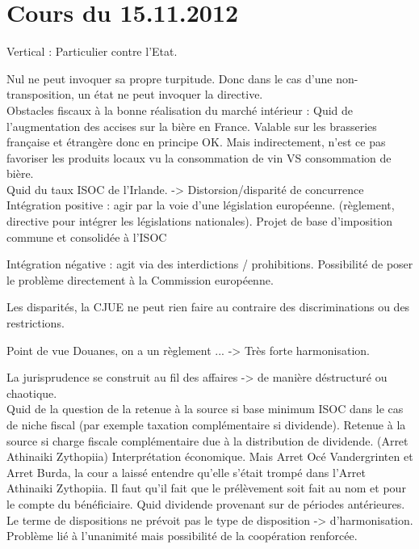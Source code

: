 \documentclass{book}
\begin{document}
  
\chapter{Cours du 15.11.2012}

Vertical : Particulier contre l'Etat.

Nul ne peut invoquer sa propre turpitude. Donc dans le cas d'une non-transposition, un état ne peut invoquer la directive.\\

Obstacles fiscaux à la bonne réalisation du marché intérieur : Quid de l'augmentation des accises sur la bière en France. Valable sur les brasseries française et étrangère donc en principe OK. Mais indirectement, n'est ce pas favoriser les produits locaux vu la consommation de vin VS consommation de bière.\\

Quid du taux ISOC de l'Irlande. -> Distorsion/disparité de concurrence\\

Intégration positive : agir par la voie d'une législation européenne. (règlement, directive pour intégrer les législations nationales). Projet de base d'imposition commune et consolidée à l'ISOC

Intégration négative : agit via des interdictions / prohibitions. Possibilité de poser le problème directement à la Commission européenne.

Les disparités, la CJUE ne peut rien faire au contraire des discriminations ou des restrictions.

Point de vue Douanes, on a un règlement ... -> Très forte harmonisation.

La jurisprudence se construit au fil des affaires -> de manière déstructuré ou chaotique. \\

Quid de la question de la retenue à la source si base minimum ISOC dans le cas de niche fiscal (par exemple taxation complémentaire si dividende). Retenue à la source si charge fiscale complémentaire due à la distribution de dividende. (Arret Athinaiki Zythopiia) Interprétation économique. Mais Arret Océ Vandergrinten et Arret Burda, la cour a laissé entendre qu'elle s'était trompé dans l'Arret Athinaiki Zythopiia. Il faut qu'il fait que le prélèvement soit fait au nom et pour le compte du bénéficiaire. Quid dividende provenant sur de périodes antérieures.\\

Le terme de dispositions ne prévoit pas le type de disposition -> d'harmonisation. Problème lié à l'unanimité mais possibilité de la coopération renforcée.\\
\end{document}
